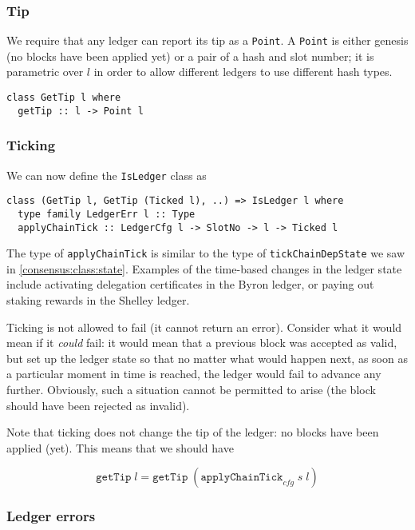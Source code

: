 \subsubsection{Tip}

We require that any ledger can report its tip as a \lstinline!Point!. A
\lstinline!Point! is either genesis (no blocks have been applied yet) or a pair
of a hash and slot number; it is parametric over $l$ in order to allow
different ledgers to use different hash types.
%
\begin{lstlisting}
class GetTip l where
  getTip :: l -> Point l
\end{lstlisting}

\subsubsection{Ticking}

We can now define the \lstinline!IsLedger! class as
%
\begin{lstlisting}
class (GetTip l, GetTip (Ticked l), ..) => IsLedger l where
  type family LedgerErr l :: Type
  applyChainTick :: LedgerCfg l -> SlotNo -> l -> Ticked l
\end{lstlisting}

The type of \lstinline!applyChainTick! is similar to the type of
\lstinline!tickChainDepState! we saw in \cref{consensus:class:state}.
Examples of the time-based changes in the ledger state include activating
delegation certificates in the Byron ledger, or paying out staking rewards
in the Shelley ledger.

Ticking is not allowed to fail (it cannot return an error). Consider what it
would mean if it \emph{could} fail: it would mean that a previous block was
accepted as valid, but set up the ledger state so that no matter what would
happen next, as soon as a particular moment in time is reached, the ledger would
fail to advance any further. Obviously, such a situation cannot be permitted to
arise (the block should have been rejected as invalid).

Note that ticking does not change the tip of the ledger: no blocks have been
applied (yet). This means that we should have

\begin{equation}
  \mathtt{getTip} \; l
= \mathtt{getTip} \; (\mathtt{applyChainTick}_\mathit{cfg} \; s \; l)
\end{equation}

\subsubsection{Ledger errors}

